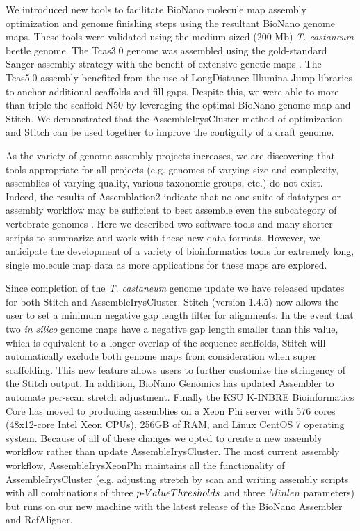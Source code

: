 \documentclass{bmcart}
\begin{document}
We introduced new tools to facilitate BioNano molecule map assembly optimization and genome finishing steps using the resultant BioNano genome maps. These tools were validated using the medium-sized (200 Mb) \textit{T. castaneum} beetle genome. The Tcas3.0 genome was  assembled using the gold-standard Sanger assembly strategy \cite{Beetle2008} with the benefit of extensive genetic maps \cite{BeetleGenMap2005}. The Tcas5.0 assembly benefited from the use of LongDistance Illumina Jump libraries to anchor additional scaffolds and fill gaps. Despite this, we were able to more than triple the scaffold N50 by leveraging the optimal BioNano genome map and Stitch. We demonstrated that the AssembleIrysCluster method of optimization and Stitch can be used together to improve the contiguity of a draft genome.

As the variety of genome assembly projects increases, we are discovering that tools appropriate for all projects (e.g. genomes of varying size and complexity, assemblies of varying quality, various taxonomic groups, etc.) do not exist. Indeed, the results of Assemblation2 indicate that no one suite of datatypes or assembly workflow may be sufficient to best assemble even the subcategory of vertebrate genomes \cite{Assem22013}. Here we described two software tools and many shorter scripts to summarize and work with these new data formats. However, we anticipate the development of a variety of bioinformatics tools for extremely long, single molecule map data as more applications for these maps are explored.

Since completion of the \textit{T. castaneum} genome update we have released updates for both Stitch and AssembleIrysCluster. Stitch (version 1.4.5) now allows the user to set a minimum negative gap length filter for alignments. In the event that two \textit{in silico} genome maps have a negative gap length smaller than this value, which is equivalent to a longer overlap of the sequence scaffolds, Stitch will automatically exclude both genome maps from consideration when super scaffolding. This new feature allows users to further customize the stringency of the Stitch output. In addition, BioNano Genomics has updated Assembler to automate per-scan stretch adjustment. Finally the KSU K-INBRE Bioinformatics Core has moved to producing assemblies on a Xeon Phi server with 576 cores (48x12-core Intel Xeon CPUs), 256GB of RAM, and Linux CentOS 7 operating system. Because of all of these changes we opted to create a new assembly workflow rather than update AssembleIrysCluster. The most current assembly workflow, AssembleIrysXeonPhi maintains all the functionality of AssembleIrysCluster (e.g. adjusting stretch by scan and writing assembly scripts with all combinations of three $p\textnormal{-}Value Thresholds$ and three $Minlen$ parameters) but runs on our new machine with the latest release of the BioNano Assembler and RefAligner.
\end{document}
